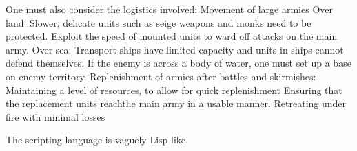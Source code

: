 \documentclass[a4paper,12pt]{article}
\begin{document}
One must also consider the logistics involved: 
Movement of large armies
	Over land:	Slower, delicate units such as seige weapons and monks need to be protected.
				Exploit the speed of mounted units to ward off attacks on the main army.
	Over sea:	Transport ships have limited capacity and units in ships cannot defend themselves.
				If the enemy is across a body of water, one must set up a base on enemy territory. 
Replenishment of armies after battles and skirmishes:
	Maintaining a level of resources, to allow for quick replenishment
	Ensuring that the replacement units reachthe main army in a usable manner.
Retreating under fire with minimal losses


The scripting language is vaguely Lisp-like.

\end{document}
